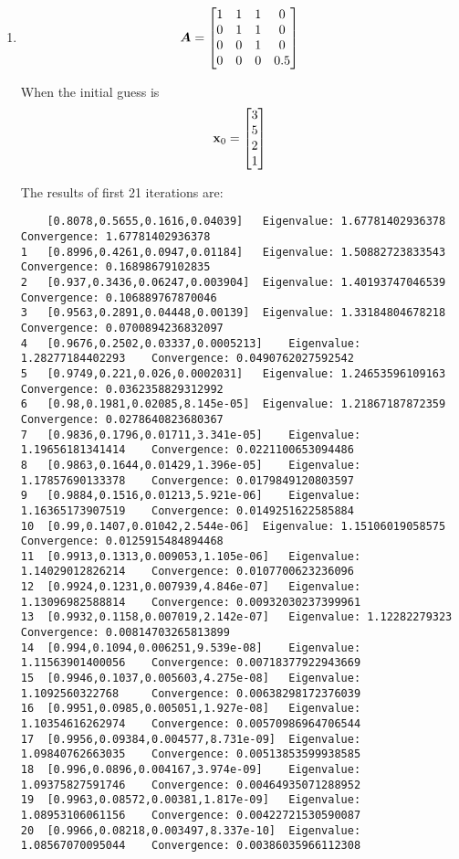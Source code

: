 \documentclass{article}
\begin{document}
\begin{enumerate}
\item 
\begin{align}
\boldsymbol{A}=\begin{bmatrix} 1  & 1  & 1  & 0    \\   
0  & 1  & 1  & 0    \\   
0  & 0  & 1  & 0    \\   
0  & 0  & 0  & 0.5    \\   \end{bmatrix}
\end{align}

When the initial guess is 
\begin{align}
\boldsymbol{\mathrm{x}}_0=\begin{bmatrix} 3 \\ 5 \\ 2\\ 1 \end{bmatrix}
\end{align}

The results of first 21 iterations are: 
\begin{verbatim}
	[0.8078,0.5655,0.1616,0.04039]	 Eigenvalue: 1.67781402936378	 Convergence: 1.67781402936378
1	[0.8996,0.4261,0.0947,0.01184]	 Eigenvalue: 1.50882723833543	 Convergence: 0.16898679102835
2	[0.937,0.3436,0.06247,0.003904]	 Eigenvalue: 1.40193747046539	 Convergence: 0.106889767870046
3	[0.9563,0.2891,0.04448,0.00139]	 Eigenvalue: 1.33184804678218	 Convergence: 0.0700894236832097
4	[0.9676,0.2502,0.03337,0.0005213]	 Eigenvalue: 1.28277184402293	 Convergence: 0.0490762027592542
5	[0.9749,0.221,0.026,0.0002031]	 Eigenvalue: 1.24653596109163	 Convergence: 0.0362358829312992
6	[0.98,0.1981,0.02085,8.145e-05]	 Eigenvalue: 1.21867187872359	 Convergence: 0.0278640823680367
7	[0.9836,0.1796,0.01711,3.341e-05]	 Eigenvalue: 1.19656181341414	 Convergence: 0.0221100653094486
8	[0.9863,0.1644,0.01429,1.396e-05]	 Eigenvalue: 1.17857690133378	 Convergence: 0.0179849120803597
9	[0.9884,0.1516,0.01213,5.921e-06]	 Eigenvalue: 1.16365173907519	 Convergence: 0.0149251622585884
10	[0.99,0.1407,0.01042,2.544e-06]	 Eigenvalue: 1.15106019058575	 Convergence: 0.0125915484894468
11	[0.9913,0.1313,0.009053,1.105e-06]	 Eigenvalue: 1.14029012826214	 Convergence: 0.0107700623236096
12	[0.9924,0.1231,0.007939,4.846e-07]	 Eigenvalue: 1.13096982588814	 Convergence: 0.00932030237399961
13	[0.9932,0.1158,0.007019,2.142e-07]	 Eigenvalue: 1.12282279323	 Convergence: 0.00814703265813899
14	[0.994,0.1094,0.006251,9.539e-08]	 Eigenvalue: 1.11563901400056	 Convergence: 0.00718377922943669
15	[0.9946,0.1037,0.005603,4.275e-08]	 Eigenvalue: 1.1092560322768	 Convergence: 0.00638298172376039
16	[0.9951,0.0985,0.005051,1.927e-08]	 Eigenvalue: 1.10354616262974	 Convergence: 0.00570986964706544
17	[0.9956,0.09384,0.004577,8.731e-09]	 Eigenvalue: 1.09840762663035	 Convergence: 0.00513853599938585
18	[0.996,0.0896,0.004167,3.974e-09]	 Eigenvalue: 1.09375827591746	 Convergence: 0.00464935071288952
19	[0.9963,0.08572,0.00381,1.817e-09]	 Eigenvalue: 1.08953106061156	 Convergence: 0.00422721530590087
20	[0.9966,0.08218,0.003497,8.337e-10]	 Eigenvalue: 1.08567070095044	 Convergence: 0.00386035966112308
\end{verbatim}


\end{enumerate}
\end{document}
